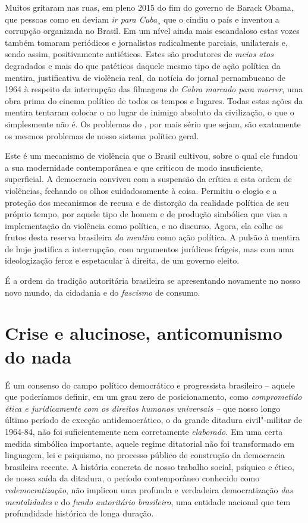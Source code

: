 Muitos gritaram nas ruas, em pleno 2015 do fim do governo de Barack
Obama, que pessoas como eu deviam \emph{ir para Cuba}¸ que o  cindiu o
país e inventou a corrupção organizada no Brasil. Em um nível ainda mais
escandaloso estas vozes também tomaram periódicos e jornalistas
radicalmente parciais, unilaterais e, sendo assim, positivamente
antiéticos. Estes são produtores de \emph{meios atos} degradados e mais
do que patéticos daquele mesmo tipo de ação política da mentira,
justificativa de violência real, da notícia do jornal pernambucano de
1964 à respeito da interrupção das filmagens de \emph{Cabra marcado para
morrer}, uma obra prima do cinema político de todos os tempos e lugares.
Todas estas ações da mentira tentaram colocar o  no lugar de inimigo
absoluto da civilização, o que o  simplesmente não é. Os problemas do
, por mais sério que sejam, são exatamente os mesmos problemas de
nosso sistema político geral.

Este é um mecanismo de violência que o Brasil cultivou, sobre o qual ele
fundou a sua modernidade contemporânea e que criticou de modo
insuficiente, superficial. A democracia conviveu com a suspensão da
crítica a esta ordem de violências, fechando os olhos cuidadosamente à
coisa. Permitiu o elogio e a proteção dos mecanismos de recusa e de
distorção da realidade política de seu próprio tempo, por aquele tipo de
homem e de produção simbólica que visa a implementação da violência como
política, e no discurso. Agora, ela colhe os frutos desta reserva
brasileira \emph{da mentira} como ação política. A pulsão à mentira de
hoje justifica a interrupção, com argumentos jurídicos frágeis, mas com
uma ideologização feroz e espetacular à direita, de um governo eleito.

É a ordem da tradição autoritária brasileira se apresentando novamente
no nosso novo mundo, da cidadania e do \emph{fascismo} de consumo.

\chapter{Crise e alucinose, anticomunismo do nada}

É um consenso do campo político democrático e progressista brasileiro --
aquele que poderíamos definir, em um grau zero de posicionamento, como
\emph{comprometido} \emph{ética e juridicamente} \emph{com os direitos
humanos universais --} que nosso longo último período de exceção
antidemocrático, o da grande ditadura civil"-militar de 1964-84, não foi
suficientemente nem corretamente \emph{elaborado.} Em uma certa medida
simbólica importante, aquele regime ditatorial não foi transformado em
linguagem, lei e psiquismo, no processo público de construção da
democracia brasileira recente. A história concreta de nosso trabalho
social, psíquico e ético, de nossa saída da ditadura, o período
contemporâneo conhecido como \emph{redemocratização}, não implicou uma
profunda e verdadeira democratização \emph{das mentalidades} e do
\emph{fundo autoritário brasileiro}, uma entidade nacional que tem
profundidade histórica de longa duração.

